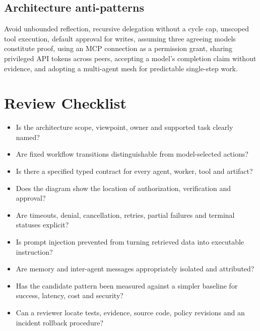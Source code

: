 \subsection{Architecture anti-patterns}
Avoid unbounded reflection, recursive delegation without a cycle cap, unscoped tool execution, default approval for writes, assuming three agreeing models constitute proof, using an MCP connection as a permission grant, sharing privileged API tokens across peers, accepting a model's completion claim without evidence, and adopting a multi-agent mesh for predictable single-step work.

\section{Review Checklist}
\begin{itemize}
\item Is the architecture scope, viewpoint, owner and supported task clearly named?
\item Are fixed workflow transitions distinguishable from model-selected actions?
\item Is there a specified typed contract for every agent, worker, tool and artifact?
\item Does the diagram show the location of authorization, verification and approval?
\item Are timeouts, denial, cancellation, retries, partial failures and terminal statuses explicit?
\item Is prompt injection prevented from turning retrieved data into executable instruction?
\item Are memory and inter-agent messages appropriately isolated and attributed?
\item Has the candidate pattern been measured against a simpler baseline for success, latency, cost and security?
\item Can a reviewer locate tests, evidence, source code, policy revisions and an incident rollback procedure?
\end{itemize}
